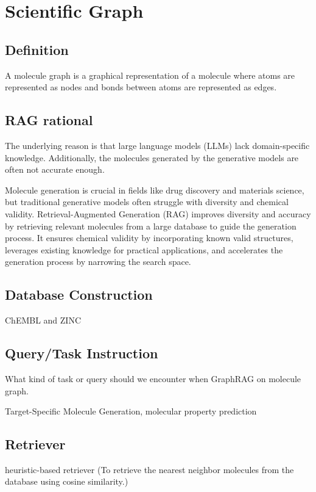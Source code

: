 \section{Scientific Graph \emojiscititle}
\subsection{Definition}
A molecule graph is a graphical representation of a molecule where atoms are represented as nodes and bonds between atoms are represented as edges.


\subsection{RAG rational}
The underlying reason is that large language models (LLMs) lack domain-specific knowledge. Additionally, the molecules generated by the generative models are often not accurate enough. 

Molecule generation is crucial in fields like drug discovery and materials science, but traditional generative models often struggle with diversity and chemical validity. Retrieval-Augmented Generation (RAG)  improves diversity and accuracy by retrieving relevant molecules from a large database to guide the generation process. It ensures chemical validity by incorporating known valid structures, leverages existing knowledge for practical applications, and accelerates the generation process by narrowing the search space.

\subsection{Database Construction}
ChEMBL and ZINC


\subsection{Query/Task Instruction}
What kind of task or query should we encounter when GraphRAG on molecule graph.

Target-Specific Molecule Generation, molecular property prediction

\subsection{Retriever}
heuristic-based retriever
(To retrieve the nearest neighbor molecules from the database using cosine similarity.)

